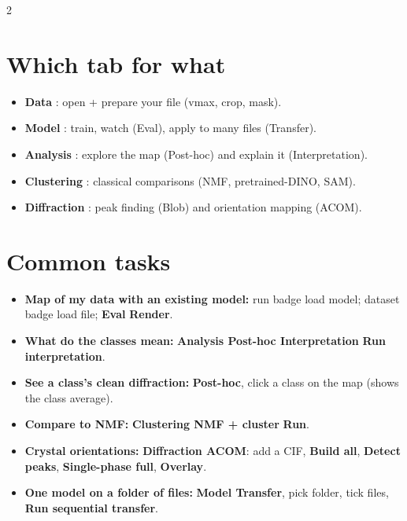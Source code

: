 \documentclass[10pt]{article}
\newcommand{\btn}[1]{\textbf{#1}}
\newcommand{\tabn}[1]{\textsf{\textbf{#1}}}
\begin{document}
\begin{multicols}{2}
\section{Which tab for what}
\begin{itemize}
\item \tabn{Data} : open + prepare your file (vmax, crop, mask).
\item \tabn{Model} : train, watch (Eval), apply to many files (Transfer).
\item \tabn{Analysis} : explore the map (Post-hoc) and explain it (Interpretation).
\item \tabn{Clustering} : classical comparisons (NMF, pretrained-DINO, SAM).
\item \tabn{Diffraction} : peak finding (Blob) and orientation mapping (ACOM).
\end{itemize}

\columnbreak

\section{Common tasks}
\begin{itemize}
\item \textbf{Map of my data with an existing model:} run badge \textrightarrow{}
load model; dataset badge \textrightarrow{} load file; \tabn{Eval} \textrightarrow{}
\btn{Render}.
\item \textbf{What do the classes mean:} \tabn{Analysis \textrightarrow{} Post-hoc
\textrightarrow{} Interpretation} \textrightarrow{} \btn{Run interpretation}.
\item \textbf{See a class's clean diffraction:} \tabn{Post-hoc}, click a class on
the map (shows the class average).
\item \textbf{Compare to NMF:} \tabn{Clustering \textrightarrow{} NMF + cluster}
\textrightarrow{} \btn{Run}.
\item \textbf{Crystal orientations:} \tabn{Diffraction \textrightarrow{} ACOM}:
add a CIF, \btn{Build all}, \btn{Detect peaks}, \btn{Single-phase full},
\btn{Overlay}.
\item \textbf{One model on a folder of files:} \tabn{Model \textrightarrow{}
Transfer}, pick folder, tick files, \btn{Run sequential transfer}.
\end{itemize}


\end{multicols}
\end{document}
